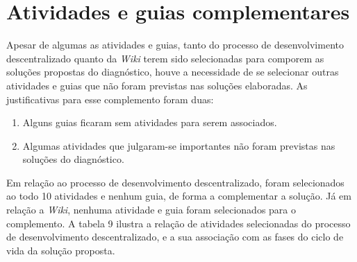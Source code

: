 \section{Atividades e guias complementares}

Apesar de algumas as atividades e guias, tanto do processo de desenvolvimento descentralizado quanto da \textit{Wiki} terem sido selecionadas para comporem as soluções propostas do diagnóstico, houve a necessidade de se selecionar outras atividades e guias que não foram previstas nas soluções elaboradas. As justificativas para esse complemento foram duas:\clearpage

\begin{enumerate}
\item Alguns guias ficaram sem atividades para serem associados.
\item Algumas atividades que julgaram-se importantes não foram previstas nas soluções do diagnóstico.
\end{enumerate}

Em relação ao processo de desenvolvimento descentralizado, foram selecionados ao todo 10 atividades e nenhum guia, de forma a complementar a solução. Já em relação a \textit{Wiki}, nenhuma atividade e guia foram selecionados para o complemento. A tabela 9 ilustra a relação de atividades selecionadas do processo de desenvolvimento descentralizado, e a sua associação com as fases do ciclo de vida da solução proposta.

